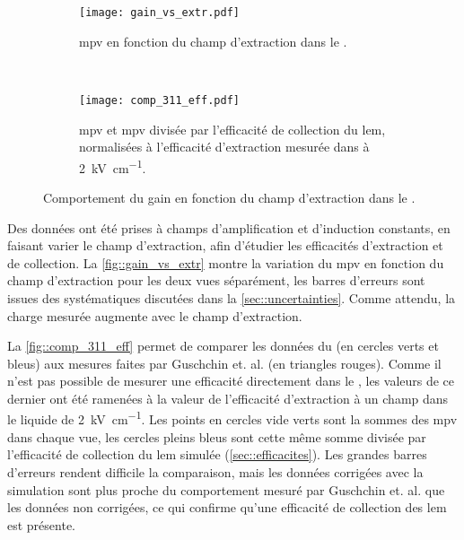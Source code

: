       \begin{figure}[htbp]
        \centering
        \begin{subfigure}[t]{0.9\textwidth}
          \centering
          \texttt{[image: gain\_vs\_extr.pdf]}
        \caption{\label{fig::gain_vs_extr}\gls{mpv} en fonction du champ d'extraction dans le \TOO{}.}
        \end{subfigure}\\
        \begin{subfigure}[t]{0.9\textwidth}
          \centering
          \texttt{[image: comp\_311\_eff.pdf]}
          \caption{\label{fig::comp_311_eff}\gls{mpv} et \gls{mpv} divisée par l'efficacité de collection du \gls{lem}, normalisées à l'efficacité d'extraction mesurée dans \cite{guschin} à \SI{2}{\kilo\volt\per\centi\meter}.}
        \end{subfigure}
        \caption[Comportement du gain en fonction du champ d'extraction dans le \TOO{}]{Comportement du gain en fonction du champ d'extraction dans le \TOO{}.}
      \end{figure}
      Des données ont été prises à champs d'amplification et d'induction constants, en faisant varier le champ d'extraction, afin d'étudier les efficacités d'extraction et de collection. La \autoref{fig::gain_vs_extr} montre la variation du \gls{mpv} en fonction du champ d'extraction pour les deux vues séparément, les barres d'erreurs sont issues des systématiques discutées dans la \autoref{sec::uncertainties}. Comme attendu, la charge mesurée augmente avec le champ d'extraction.

      La \autoref{fig::comp_311_eff} permet de comparer les données du \TOO{} (en cercles verts et bleus) aux mesures faites par Guschchin et. al.\cite{guschin} (en triangles rouges). Comme il n'est pas possible de mesurer une efficacité directement dans le \TOO{}, les valeurs de ce dernier ont été ramenées à la valeur de l'efficacité d'extraction à un champ dans le liquide de \SI{2}{\kilo\volt\per\centi\meter}. Les points en cercles vide verts sont la sommes des \gls{mpv} dans chaque vue, les cercles pleins bleus sont cette même somme divisée par l'efficacité de collection du \gls{lem} simulée (\autoref{sec::efficacites}). Les grandes barres d'erreurs rendent difficile la comparaison, mais les données corrigées avec la simulation sont plus proche du comportement mesuré par Guschchin et. al. que les données non corrigées, ce qui confirme qu'une efficacité de collection des \gls{lem} est présente.

